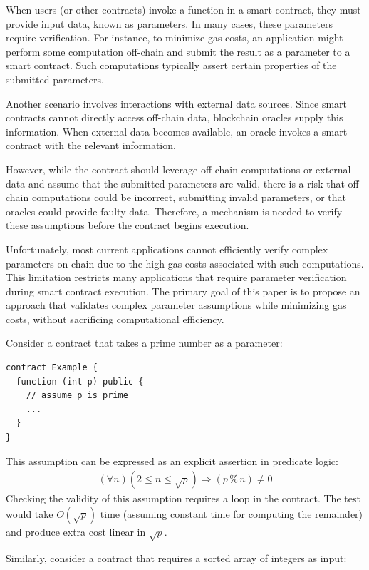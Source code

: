 \documentclass[runningheads]{llncs}
\begin{document}
When users (or other contracts) invoke a function in a smart contract, they must provide input data, known as parameters. In many cases, these parameters require verification. For instance, to minimize gas costs, an application might perform some computation off-chain and submit the result as a parameter to a smart contract. Such computations typically assert certain properties of the submitted parameters.

Another scenario involves interactions with external data sources. Since smart contracts cannot directly access off-chain data, blockchain oracles supply this information. When external data becomes available, an oracle invokes a smart contract with the relevant information.

However, while the contract should leverage off-chain computations or external data and assume that the submitted parameters are valid, there is a risk that off-chain computations could be incorrect, submitting invalid parameters, or that oracles could provide faulty data. Therefore, a mechanism is needed to verify these assumptions before the contract begins execution.

Unfortunately, most current applications cannot efficiently verify complex parameters on-chain due to the high gas costs associated with such computations. This limitation restricts many applications that require parameter verification during smart contract execution. The primary goal of this paper is to propose an approach that validates complex parameter assumptions while minimizing gas costs, without sacrificing computational efficiency.

Consider a contract that takes a prime number as a parameter:
\begin{lstlisting}[numbers=none]
contract Example {
  function (int p) public {
    // assume p is prime
    ...
  }
}
\end{lstlisting}
This assumption can be expressed as an explicit assertion in predicate logic:
\begin{gather*}
\label{eq1}
  (\forall n) (2 \leq n \leq \sqrt{p}) \Rightarrow (p \mathbin{\%} n) \ne 0
\end{gather*}
Checking the validity of this assumption requires a loop in the contract. The test would take \(O(\sqrt{p})\) time (assuming constant time for computing the remainder) and produce extra cost linear in \(\sqrt{p}\).

Similarly, consider a contract that requires a sorted array of integers as input:
\end{document}

